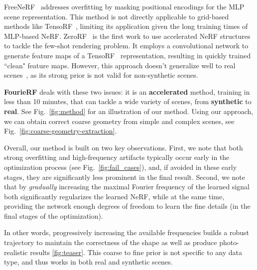FreeNeRF~\cite{yang2023freenerf} addresses overfitting by masking positional encodings for the MLP scene representation. This method is not directly applicable to grid-based methods like TensoRF~\cite{Chen2022ECCV}, limiting its application given the long training times of MLP-based NeRF. ZeroRF~\cite{shi2024zerorf} is the first work to use accelerated NeRF structures to tackle the few-shot rendering problem. It employs a convolutional network to generate feature maps of a TensoRF~\cite{Chen2022ECCV} representation, resulting in quickly trained ``clean" feature maps. However, this approach doesn't generalize well to real scenes~\cite{shi2024zerorf}, as its strong prior is not valid for non-synthetic scenes.

\textbf{FourieRF} deals with these two issues: it is an \textbf{accelerated} method, training in less than 10 minutes, that can tackle a wide variety of scenes, from \textbf{synthetic} to \textbf{real}. See Fig.~\ref{fig:method} for an illustration of our method. Using our approach, we can obtain correct coarse geometry from simple and complex scenes, see Fig.~\ref{fig:coarse-geometry-extraction}. 

Overall, our method is built on two key observations. First, we note that both strong overfitting and high-frequency artifacts typically occur early in the optimization process (see Fig.~\ref{fig:fail_cases}), and, if avoided in these early stages, they are significantly less prominent in the final result. Second, we note that by \textit{gradually} increasing the maximal Fourier frequency of the learned signal both significantly regularizes the learned NeRF, while at the same time, providing the network enough degrees of freedom to learn the fine details (in the final stages of the optimization). 

In other words, progressively increasing the available frequencies builds a robust trajectory to maintain the correctness of the shape as well as produce photo-realistic results \ref{fig:teaser}. This coarse to fine prior is not specific to any data type, and thus works in both real and synthetic scenes.
